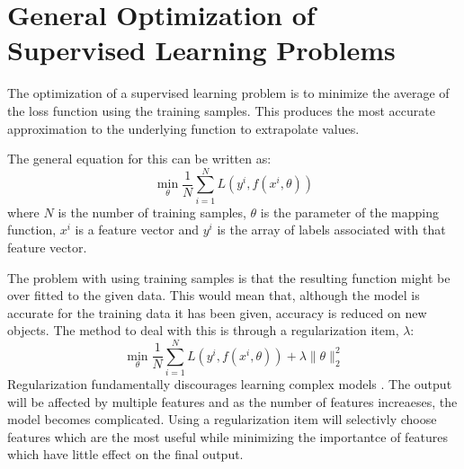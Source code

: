 \documentclass[10pt,a4paper]{report}
\begin{document}
		\section{General Optimization of Supervised Learning Problems}
			The optimization of a supervised learning problem is to minimize the average of the loss function using the training samples. This produces the
			most accurate approximation to the underlying function to extrapolate values. \par
			The general equation \autocite[p. 3]{SurveyOfOptimizationMethods} for this can be written as:
			\begin{equation}
				\min_\theta \frac{1}{N} \sum_{i=1}^{N} L(y^i, f(x^i,\theta))
				\label{eq:supervised-learning-general}
			\end{equation}
			where $N$ is the number of training samples, $\theta$ is the parameter of the mapping function, $x^i$ is a feature vector
			and $y^i$ is the array of labels associated with that feature vector. \par
			The problem with using training samples is that the resulting function might be over fitted to the given data. This would mean
			that, although the model is accurate for the training data it has been given, accuracy is reduced on new objects. The method to
			deal with this is through a regularization item, $\lambda$:
			\begin{equation}
				\min_\theta \frac{1}{N} \sum_{i=1}^{N} L(y^i, f(x^i,\theta)) + \lambda\| \theta\|_{2}^{2}
				\label{eq:supervised-learning-regularization}
			\end{equation}
			Regularization fundamentally discourages learning complex models \autocite[p. 4]{OverfittingSupervisedLearning}. The output will be affected by multiple features and as the number of features increaeses,
			the model becomes complicated. Using a regularization item will selectivly choose features which are the most useful while minimizing the importantce of features which have little effect on the final output.
\end{document}
